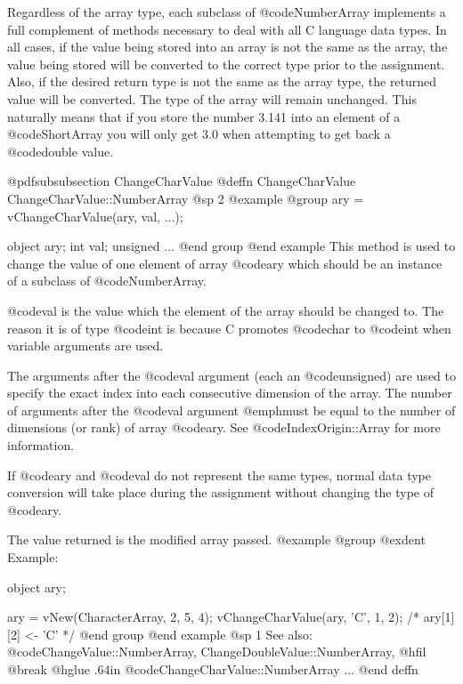 Regardless of the array type, each subclass of @code{NumberArray}
implements a full complement of methods necessary to deal with all C
language data types.  In all cases, if the value being stored into an
array is not the same as the array, the value being stored will be
converted to the correct type prior to the assignment.  Also, if the
desired return type is not the same as the array type, the returned
value will be converted.  The type of the array will remain unchanged.
This naturally means that if you store the number 3.141 into an element
of a @code{ShortArray} you will only get 3.0 when attempting to get
back a @code{double} value.










@pdfsubsubsection {ChangeCharValue}
@deffn {ChangeCharValue} ChangeCharValue::NumberArray
@sp 2
@example
@group
ary = vChangeCharValue(ary, val, ...);

object    ary;
int       val;
unsigned  ...
@end group
@end example
This method is used to change the value of one element of
array @code{ary} which should be an instance of a subclass of
@code{NumberArray}.

@code{val} is the value which the element of the array should be changed
to.  The reason it is of type @code{int} is because C promotes @code{char}
to @code{int} when variable arguments are used.

The arguments after the @code{val} argument (each an @code{unsigned})
are used to specify the exact index into each consecutive dimension of
the array.  The number of arguments after the @code{val} argument
@emph{must} be equal to the number of dimensions (or rank) of array
@code{ary}.  See @code{IndexOrigin::Array} for more information.

If @code{ary} and @code{val} do not represent the same types, normal
data type conversion will take place during the assignment without
changing the type of @code{ary}.

The value returned is the modified array passed.
@example
@group
@exdent Example:

object  ary;

ary = vNew(CharacterArray, 2, 5, 4);
vChangeCharValue(ary, 'C', 1, 2);
/*  ary[1][2] <- 'C'  */
@end group
@end example
@sp 1
See also:  @code{ChangeValue::NumberArray, ChangeDoubleValue::NumberArray,}
@hfil @break @hglue .64in @code{ChangeCharValue::NumberArray}  ...
@end deffn







